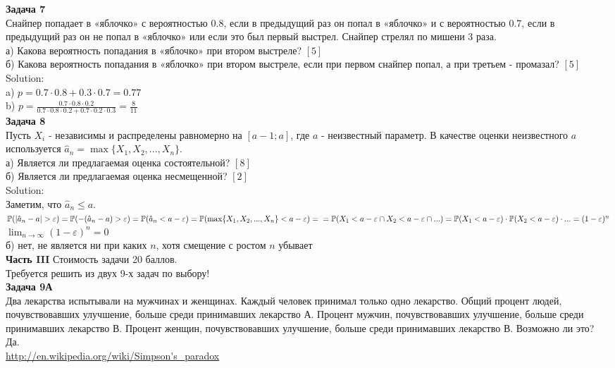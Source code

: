 \documentclass[12pt, a4paper]{article}\usepackage[]{graphicx}\usepackage[]{color}
\begin{document}
	\textbf{Задача 7} \\ %
	Снайпер попадает в «яблочко» с вероятностью 0.8, если в предыдущий раз он попал в «яблочко» и с вероятностью 0.7, если в предыдущий раз он не попал в «яблочко» или если это был первый выстрел. Снайпер стрелял по мишени 3 раза. \\
	а) Какова вероятность попадания в «яблочко» при втором выстреле? $[5]$ \\
	б) Какова вероятность попадания в «яблочко» при втором выстреле, если при первом снайпер попал, а при третьем - промазал? $[5]$ \\
	Solution: \\
	a) $p=0.7\cdot 0.8+ 0.3\cdot 0.7=0.77$ \\
	b) $p=\frac{0.7\cdot0.8\cdot0.2}{0.7\cdot 0.8\cdot 0.2 + 0.7\cdot 0.2 \cdot 0.3}=\frac{8}{11}$ \\


	\textbf{Задача 8} \\ %
	Пусть $X_{i}$ - независимы и распределены равномерно на $[a-1;a]$, где $a$ - неизвестный параметр. В качестве оценки неизвестного $a$ используется $\hat{a}_{n}=\max\{X_{1},X_{2},...,X_{n}\}$. \\
	а) Является ли предлагаемая оценка состоятельной? $[8]$ \\
	б) Является ли предлагаемая оценка несмещенной? $[2]$ \\
	Solution: \\
	Заметим, что $\hat{a}_{n}\leq a$. \\
	$\P(|\hat{a}_{n}-a|>\varepsilon)=\P(-(\hat{a}_{n}-a)>\varepsilon)=\P(\hat{a}_{n}<a-\varepsilon)=\P(\max\{X_{1},X_{2},...,X_{n}\}<a-\varepsilon)= \\
	=\P(X_{1}<a-\varepsilon \cap X_{2}< a-\varepsilon\cap ...)=
	\P(X_{1}<a-\varepsilon)\cdot \P(X_{2}<a-\varepsilon)\cdot ...=(1-\varepsilon)^{n}$ \\
	$\lim_{n\to\infty} (1-\varepsilon)^{n} =0$ \\
	б) нет, не является ни при каких $n$, хотя смещение с ростом $n$ убывает \\


	\textbf{Часть III} Стоимость задачи 20 баллов. \\

	Требуется решить \textbf{} из двух 9-х задач по
	выбору! \\


	\textbf{Задача 9А} \\
	Два лекарства испытывали на мужчинах и женщинах. Каждый
	человек принимал только одно лекарство. Общий процент людей,
	почувствовавших улучшение, больше среди принимавших лекарство А.
	Процент мужчин, почувствовавших улучшение, больше среди принимавших лекарство В. Процент женщин, почувствовавших улучшение, больше среди принимавших лекарство В. Возможно ли это? \\
	Да. \\
	\url{http://en.wikipedia.org/wiki/Simpson's_paradox} \\
\end{document}
